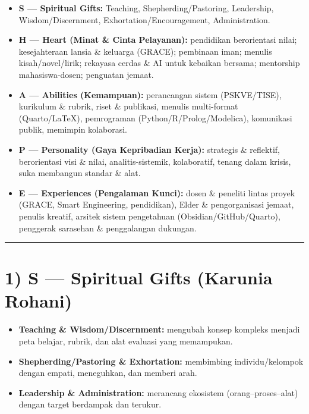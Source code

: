 \documentclass[
  letterpaper,
  DIV=11,
  numbers=noendperiod]{scrreprt}
\providecommand{\tightlist}{%
  \setlength{\itemsep}{0pt}\setlength{\parskip}{0pt}}
\begin{document}
\begin{itemize}
\tightlist
\item
  \textbf{S --- Spiritual Gifts:} Teaching, Shepherding/Pastoring,
  Leadership, Wisdom/Discernment, Exhortation/Encouragement,
  Administration.
\item
  \textbf{H --- Heart (Minat \& Cinta Pelayanan):} pendidikan
  berorientasi nilai; kesejahteraan lansia \& keluarga (GRACE);
  pembinaan iman; menulis kisah/novel/lirik; rekayasa cerdas \& AI untuk
  kebaikan bersama; mentorship mahasiswa-dosen; penguatan jemaat.
\item
  \textbf{A --- Abilities (Kemampuan):} perancangan sistem (PSKVE/TISE),
  kurikulum \& rubrik, riset \& publikasi, menulis multi-format
  (Quarto/LaTeX), pemrograman (Python/R/Prolog/Modelica), komunikasi
  publik, memimpin kolaborasi.
\item
  \textbf{P --- Personality (Gaya Kepribadian Kerja):} strategis \&
  reflektif, berorientasi visi \& nilai, analitis-sistemik, kolaboratif,
  tenang dalam krisis, suka membangun standar \& alat.
\item
  \textbf{E --- Experiences (Pengalaman Kunci):} dosen \& peneliti
  lintas proyek (GRACE, Smart Engineering, pendidikan), Elder \&
  pengorganisasi jemaat, penulis kreatif, arsitek sistem pengetahuan
  (Obsidian/GitHub/Quarto), penggerak sarasehan \& penggalangan
  dukungan.
\end{itemize}

\begin{center}\rule{0.5\linewidth}{0.5pt}\end{center}

\section{1) S --- Spiritual Gifts (Karunia
Rohani)}\label{s-spiritual-gifts-karunia-rohani}

\begin{itemize}
\tightlist
\item
  \textbf{Teaching \& Wisdom/Discernment:} mengubah konsep kompleks
  menjadi peta belajar, rubrik, dan alat evaluasi yang memampukan.
\item
  \textbf{Shepherding/Pastoring \& Exhortation:} membimbing
  individu/kelompok dengan empati, meneguhkan, dan memberi arah.
\item
  \textbf{Leadership \& Administration:} merancang ekosistem
  (orang--proses--alat) dengan target berdampak dan terukur.
\end{itemize}
\end{document}

